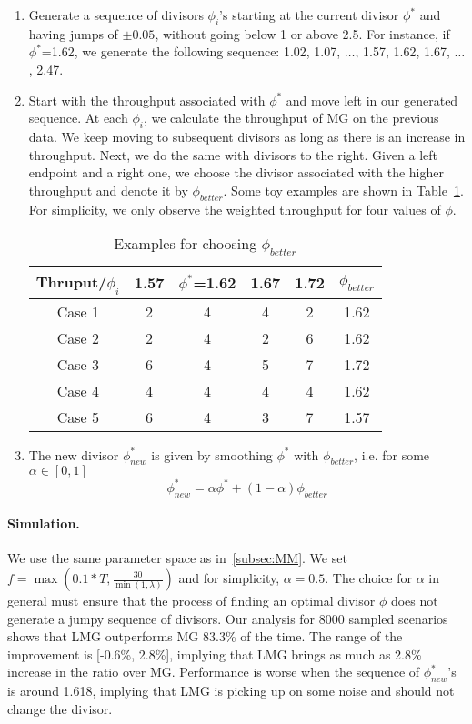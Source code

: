 \documentclass[oribibl]{llncs}
\begin{document}
\begin {enumerate}
\item Generate a sequence of divisors $\phi_i$'s starting at the current divisor $\phi^{*}$ and having jumps of $\pm 0.05$, without going below 1 or above 2.5. For instance, if $\phi^{*}$=1.62, we generate the following sequence: 1.02, 1.07, $\hdots$, 1.57, 1.62, 1.67, $\hdots$, 2.47.

\item Start with the throughput associated with $\phi^{*}$ and move left in our generated sequence. At each $\phi_i$, we calculate the throughput of MG on the previous data. We keep moving to subsequent divisors as long as there is an increase in throughput. Next, we do the same with divisors to the right. Given a left endpoint and a right one, we choose the divisor associated with the higher throughput and denote it by $\phi_{better}$. Some toy examples are shown in Table~\ref{tab:LMG}. For simplicity, we only observe the weighted throughput for four values of $\phi$.

\begin{table}[ht]
\centering
 \begin{tabular}{c || c c c c || c} 
 \hline
 Thruput/$\phi_i$  & 1.57 & $\phi^{*}$=1.62 & 1.67 & 1.72 &   $\phi_{better}$\\  
 \hline\hline
Case 1  & 2& 4& 4& 2&  1.62 \\ 
 \hline
Case 2  & 2& 4& 2& 6&  1.62 \\ 
 \hline 
 Case 3  & 6& 4& 5& 7 & 1.72 \\ 
 \hline
 Case 4  & 4& 4& 4& 4 & 1.62 \\ 
 \hline
 Case 5  & 6& 4& 3& 7 & 1.57 \\ 
 \hline

\end{tabular}
 \caption{Examples for choosing $\phi_{better}$}
 \label{tab:LMG}
\end{table}

\item The new divisor $\phi^{*}_{new}$ is given by smoothing $\phi^{*}$ with $\phi_{better}$, i.e. for some $\alpha \in [0,1]$ $$\phi^{*}_{new} = \alpha \phi^{*} + (1-\alpha) \phi_{better}$$
\end{enumerate}


\paragraph {Simulation.} We use the same parameter space as
in~\ref{subsec:MM}. We set $f=\max(0.1*T,
\frac{30}{\min(1, \lambda)})$ and for simplicity, $\alpha= 0.5$. The choice for $\alpha$ in general must ensure that the process of finding an
optimal divisor $\phi$ does not generate a jumpy sequence of
divisors. Our analysis for 8000 sampled scenarios shows that LMG outperforms MG
83.3\% of the time. The range of the improvement is [-0.6\%, 2.8\%],
implying that LMG brings as much as 2.8\% increase in the ratio over
MG. Performance is worse when the sequence of $\phi^{*}_{new}$'s is
around 1.618, implying that LMG is picking up on some noise and
should not change the divisor.  
\end{document}
